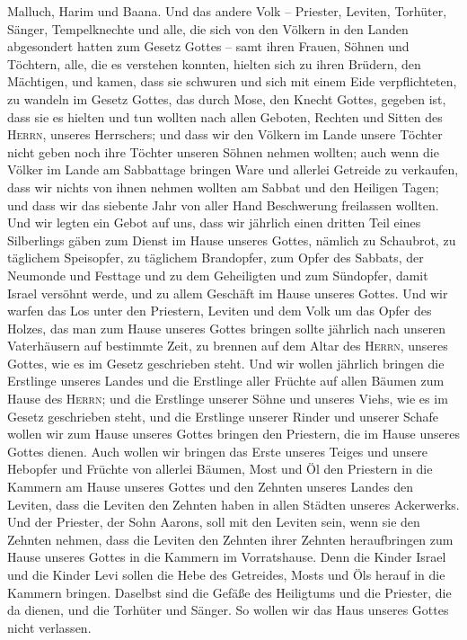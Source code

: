  Malluch, Harim und Baana.  Und das andere
Volk -- Priester, Leviten, Torhüter, Sänger, Tempelknechte und alle, die
sich von den Völkern in den Landen abgesondert hatten zum Gesetz Gottes
-- samt ihren Frauen, Söhnen und Töchtern, alle, die es verstehen
konnten,  hielten sich zu ihren Brüdern, den Mächtigen,
und kamen, dass sie schwuren und sich mit einem Eide verpflichteten, zu
wandeln im Gesetz Gottes, das durch Mose, den Knecht Gottes, gegeben
ist, dass sie es hielten und tun wollten nach allen Geboten, Rechten und
Sitten des \textsc{Herrn}, unseres Herrschers;  und dass
wir den Völkern im Lande unsere Töchter nicht geben noch ihre Töchter
unseren Söhnen nehmen wollten;  auch wenn die Völker im
Lande am Sabbattage bringen Ware und allerlei Getreide zu verkaufen,
dass wir nichts von ihnen nehmen wollten am Sabbat und den Heiligen
Tagen; und dass wir das siebente Jahr von aller Hand Beschwerung
freilassen wollten.  Und wir legten ein Gebot auf uns,
dass wir jährlich einen dritten Teil eines Silberlings gäben zum Dienst
im Hause unseres Gottes,  nämlich zu Schaubrot, zu
täglichem Speisopfer, zu täglichem Brandopfer, zum Opfer des Sabbats,
der Neumonde und Festtage und zu dem Geheiligten und zum Sündopfer,
damit Israel versöhnt werde, und zu allem Geschäft im Hause unseres
Gottes.  Und wir warfen das Los unter den Priestern,
Leviten und dem Volk um das Opfer des Holzes, das man zum Hause unseres
Gottes bringen sollte jährlich nach unseren Vaterhäusern auf bestimmte
Zeit, zu brennen auf dem Altar des \textsc{Herrn}, unseres Gottes, wie
es im Gesetz geschrieben steht.  Und wir wollen jährlich
bringen die Erstlinge unseres Landes und die Erstlinge aller Früchte auf
allen Bäumen zum Hause des \textsc{Herrn};  und die
Erstlinge unserer Söhne und unseres Viehs, wie es im Gesetz geschrieben
steht, und die Erstlinge unserer Rinder und unserer Schafe wollen wir
zum Hause unseres Gottes bringen den Priestern, die im Hause unseres
Gottes dienen.  Auch wollen wir bringen das Erste unseres
Teiges und unsere Hebopfer und Früchte von allerlei Bäumen, Most und Öl
den Priestern in die Kammern am Hause unseres Gottes und den Zehnten
unseres Landes den Leviten, dass die Leviten den Zehnten haben in allen
Städten unseres Ackerwerks.  Und der Priester, der Sohn
Aarons, soll mit den Leviten sein, wenn sie den Zehnten nehmen, dass die
Leviten den Zehnten ihrer Zehnten heraufbringen zum Hause unseres Gottes
in die Kammern im Vorratshause.  Denn die Kinder Israel
und die Kinder Levi sollen die Hebe des Getreides, Mosts und Öls herauf
in die Kammern bringen. Daselbst sind die Gefäße des Heiligtums und die
Priester, die da dienen, und die Torhüter und Sänger. So wollen wir das
Haus unseres Gottes nicht verlassen.

